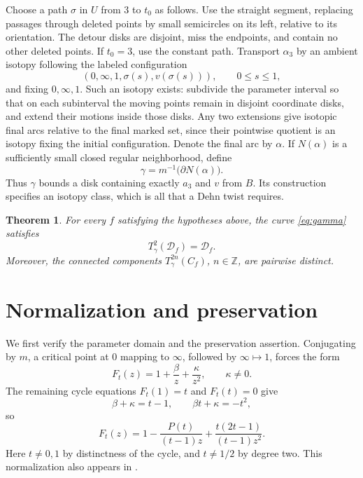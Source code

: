 \documentclass[11pt]{article}
\newcommand{\Z}{\mathbb Z}
\newcommand{\D}{\mathcal D}
\newtheorem{theorem}{Theorem}[section]
\theoremstyle{remark}
\begin{document}
Choose a path $\sigma$ in $U$ from $3$ to $t_0$ as follows. Use the straight segment, replacing passages through deleted points by small semicircles on its left, relative to its orientation. The detour disks are disjoint, miss the endpoints, and contain no other deleted points. If $t_0=3$, use the constant path. Transport $\alpha_3$ by an ambient isotopy following the labeled configuration
\begin{equation}\label{eq:config}
 (0,\infty,1,\sigma(s),v(\sigma(s))),\qquad 0\leq s\leq1,
\end{equation}
and fixing $0,\infty,1$. Such an isotopy exists: subdivide the parameter interval so that on each subinterval the moving points remain in disjoint coordinate disks, and extend their motions inside those disks. Any two extensions give isotopic final arcs relative to the final marked set, since their pointwise quotient is an isotopy fixing the initial configuration. Denote the final arc by $\alpha$. If $N(\alpha)$ is a sufficiently small closed regular neighborhood, define
\begin{equation}\label{eq:gamma}
 \gamma=m^{-1}\bigl(\partial N(\alpha)\bigr).
\end{equation}
Thus $\gamma$ bounds a disk containing exactly $a_3$ and $v$ from $B$. Its construction specifies an isotopy class, which is all that a Dehn twist requires.

\begin{theorem}\label{thm:main}
For every $f$ satisfying the hypotheses above, the curve \eqref{eq:gamma} satisfies
\[
 T_\gamma^2(\D_f)=\D_f.
\]
Moreover, the connected components $T_\gamma^{2n}(C_f)$, $n\in\Z$, are pairwise distinct.
\end{theorem}

\section{Normalization and preservation}
We first verify the parameter domain and the preservation assertion. Conjugating by $m$, a critical point at $0$ mapping to $\infty$, followed by $\infty\mapsto1$, forces the form
\[
 F_t(z)=1+\frac{\beta}{z}+\frac{\kappa}{z^2},\qquad \kappa\ne0.
\]
The remaining cycle equations $F_t(1)=t$ and $F_t(t)=0$ give
\[
 \beta+\kappa=t-1,\qquad \beta t+\kappa=-t^2,
\]
so
\begin{equation}\label{eq:Ft}
 F_t(z)=1-\frac{P(t)}{(t-1)z}
          +\frac{t(2t-1)}{(t-1)z^2}.
\end{equation}
Here $t\ne0,1$ by distinctness of the cycle, and $t\ne1/2$ by degree two. This normalization also appears in \cite[Section 6]{FKS}.
\end{document}
